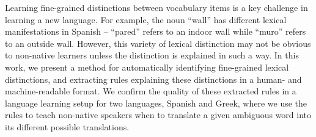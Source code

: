 Learning fine-grained distinctions between vocabulary items is a key challenge in learning a new language. For example, the noun ``wall'' has different lexical manifestations in Spanish --  ``pared'' refers to an indoor wall while ``muro'' refers to an outside wall. However, this variety of lexical distinction may not be obvious to non-native learners unless the distinction is explained in such a way. In this work, we present a method for automatically identifying fine-grained lexical distinctions, and extracting rules explaining these distinctions in a human- and machine-readable format. We confirm the quality of these extracted rules in a language learning setup for two languages, Spanish and Greek,  where we use the rules to teach non-native speakers when to translate a given ambiguous word into its different possible translations.
